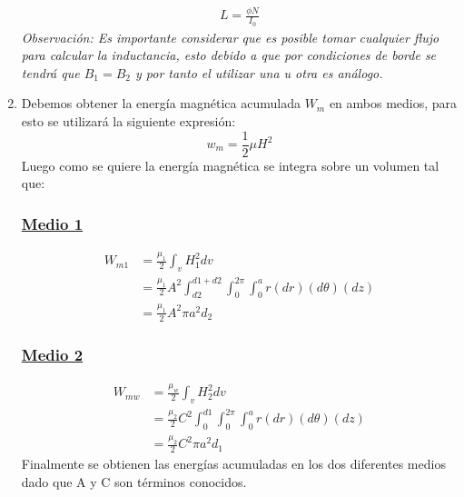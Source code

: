 \documentclass[
  11pt,
  letterpaper,
   addpoints,
   answers
  ]{exam}
\begin{document}
\begin{questions}
\begin{solution}
\begin{enumerate}
\begin{align}
            L = \frac{\phi N}{I_{0}}
        \end{align}
        \textit{Observación: Es importante considerar que es posible tomar cualquier flujo para calcular la inductancia, esto debido a que por condiciones de borde se tendrá que $B_{1} = B_{2}$ y por tanto el utilizar una u otra es análogo.}
        \item Debemos obtener la energía magnética acumulada $W_{m}$ en ambos medios, para esto se utilizará la siguiente expresión:
        \begin{equation}
            w_{m} = \frac{1}{2} \mu H^{2}
        \end{equation}
        Luego como se quiere la energía magnética se integra sobre un volumen tal que:
        \subsubsection*{\underline{Medio 1}}
        \begin{align}
            W_{m1} &= \frac{\mu_{1}}{2}\int_{v} H_{1}^{2} dv\\
                   &= \frac{\mu_{1}}{2}A^{2} \int_{d2}^{d1+d2} \int_{0}^{2\pi} \int_{0}^{a} r (dr) (d\theta) (dz)\\
                   &=\frac{\mu_{1}}{2} A^{2} \pi a^{2}d_{2} 
        \end{align}
        \subsubsection*{\underline{Medio 2}}
        \begin{align}
            W_{mw} &= \frac{\mu_{w}}{2}\int_{v} H_{2}^{2} dv\\
                   &= \frac{\mu_{2}}{2}C^{2} \int_{0}^{d1} \int_{0}^{2\pi} \int_{0}^{a} r (dr) (d\theta) (dz)\\
                   &=\frac{\mu_{2}}{2} C^{2} \pi a^{2}d_{1} 
        \end{align}
        Finalmente se obtienen las energías acumuladas en los dos diferentes medios dado que A y C son términos conocidos.
    \end{enumerate}
\end{solution}
\end{questions}
\newpage
\end{document}
